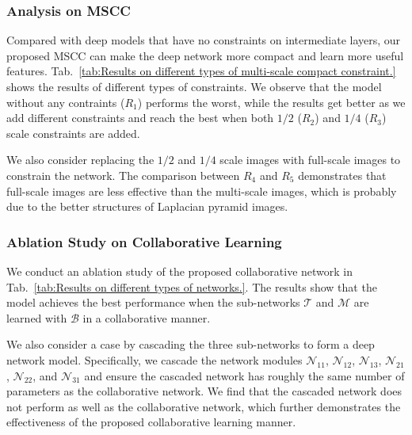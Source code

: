 \documentclass[letterpaper]{article} %
\begin{document}
\subsubsection{Analysis on MSCC}
%
Compared with deep models that have no constraints on intermediate layers, our proposed MSCC can make the deep network more compact and learn more useful features.
Tab.~\ref{tab:Results on different types of multi-scale compact constraint.} shows the results of different types of constraints.
We observe that the model without any contraints ($R_{1}$) performs the worst, while the results get better as we add different constraints and reach the best when both $1/2$ ($R_{2}$) and $1/4$ ($R_{3}$) scale constraints are added.


We also consider replacing the $1/2$ and $1/4$ scale images with full-scale images to constrain the network.
The comparison between $R_{4}$ and $R_{5}$ demonstrates that full-scale images are less effective than the multi-scale images, which is probably due to the better structures of Laplacian pyramid images.
%
\subsubsection{Ablation Study on Collaborative Learning}
%
We conduct an ablation study of the proposed collaborative network in Tab.~\ref{tab:Results on different types of networks.}. %
The results show that the model achieves the best performance when the sub-networks $\mathcal{T}$ and $\mathcal{M}$ are learned with $\mathcal{B}$ in a  collaborative manner.

We also consider a case by cascading the three sub-networks to form a deep network model.
Specifically, we cascade the network modules $\mathcal{N}_{11}$, $\mathcal{N}_{12}$, $\mathcal{N}_{13}$, $\mathcal{N}_{21}$, $\mathcal{N}_{22}$, and $\mathcal{N}_{31}$ and ensure the cascaded network has roughly the same number of parameters as the collaborative network. We find that the cascaded network does not perform as well as the collaborative network, which further demonstrates the effectiveness of the proposed collaborative learning manner.
\end{document}
